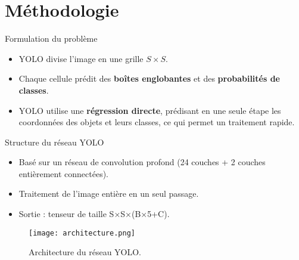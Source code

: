\documentclass{beamer}
\begin{document}

\section{Méthodologie}
\begin{frame}{Formulation du problème}
    \begin{itemize}
        \item YOLO divise l'image en une grille $S \times S$.
        \item Chaque cellule prédit des \textbf{boîtes englobantes} et des \textbf{probabilités de classes}.
        \item YOLO utilise une \textbf{régression directe}, prédisant en une seule étape les coordonnées des objets et leurs classes, ce qui permet un traitement rapide.
    \end{itemize}
\end{frame}

\begin{frame}{Structure du réseau YOLO}
    \begin{itemize}
        \item Basé sur un réseau de convolution profond (24 couches + 2 couches entièrement connectées).
        \item Traitement de l'image entière en un seul passage.
        \item Sortie : tenseur de taille S×S×(B×5+C).
    \end{itemize}
    
    \begin{figure}
        \centering
        \texttt{[image: architecture.png]}
        \caption{Architecture du réseau YOLO.}
    \end{figure}
\end{frame}
\end{document}
